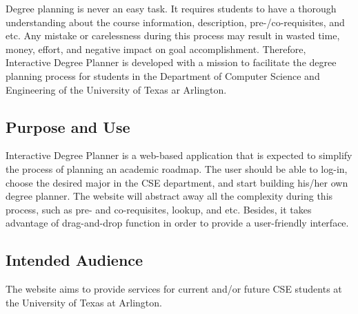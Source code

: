 Degree planning is never an easy task. It requires students to have a thorough understanding about the course information, description, pre-/co-requisites, and etc. Any mistake or carelessness during this process may result in wasted time, money, effort, and negative impact on goal accomplishment. Therefore, Interactive Degree Planner is developed with a mission to facilitate the degree planning process for students in the Department of Computer Science and Engineering of the University of Texas ar Arlington.

\subsection{Purpose and Use}
Interactive Degree Planner is a web-based application that is expected to simplify the process of planning an academic roadmap. The user should be able to log-in, choose the desired major in the CSE department, and start building his/her own degree planner. The website will abstract away all the complexity during this process, such as pre- and co-requisites, lookup, and etc. Besides, it takes advantage of drag-and-drop function in order to provide a user-friendly interface.

\subsection{Intended Audience}
The website aims to provide services for current and/or future CSE students at the University of Texas at Arlington.
